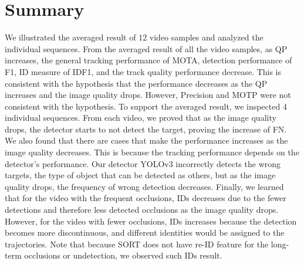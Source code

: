 \section{Summary}
\label{sec:results/summary}

We illustrated the averaged result of 12 video samples and analyzed the individual sequences. From the averaged result of all the video samples, as QP increases, the general tracking performance of MOTA, detection performance of F1, ID measure of IDF1, and the track quality performance decrease. This is consistent with the hypothesis that the performance decreases as the QP increases and the image quality drops. However, Precision and MOTP were not consistent with the hypothesis. To support the averaged result, we inspected 4 individual sequences. From each video, we proved that as the image quality drops, the detector starts to not detect the target, proving the increase of FN. We also found that there are cases that make the performance increases as the image quality decreases. This is because the tracking performance depends on the detector's performance. Our detector YOLOv3 incorrectly detects the wrong targets, the type of object that can be detected as others, but as the image quality drops,  the frequency of wrong detection decreases. Finally, we learned that for the video with the frequent occlusions, IDs decreases due to the fewer detections and therefore less detected occlusions as the image quality drops. However, for the video with fewer occlusions, IDs increases because the detection becomes more discontinuous, and different identities would be assigned to the trajectories. Note that because SORT does not have re-ID feature for the long-term occlusions or undetection, we observed such IDs result.